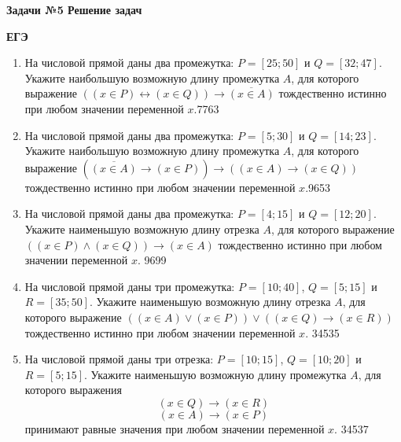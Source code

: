 \usepackage{stmaryrd}%




    \begin{center}
        \textbf{Задачи №5 Решение задач}\\
    \end{center}

    \begin{center}
        \textbf{ЕГЭ}\\
    \end{center}

    \begin{spacing}{1.1}
        \begin{enumerate}
            \item На числовой прямой даны два промежутка: $P = [25; 50]$ и $Q = [32; 47]$.
            Укажите наибольшую возможную длину промежутка $A$, для которого выражение
            $((x \in P) \leftrightarrow (x \in Q)) \rightarrow \overline{(x \in A)}$
            тождественно истинно при любом значении переменной $x$.7763

            \item На числовой прямой даны два промежутка: $P = [5; 30]$ и $Q = [14; 23]$.
            Укажите наибольшую возможную длину промежутка $A$, для которого выражение
            $(\overline{(x \in A)} \rightarrow (x \in P)) \rightarrow ((x \in A) \rightarrow (x \in Q))$
            тождественно истинно при любом значении переменной $x$.9653

            \item На числовой прямой даны два промежутка: $P = [4; 15]$ и $Q = [12; 20]$.
            Укажите наименьшую возможную длину отрезка $A$, для которого выражение
            $((x \in P) \wedge (x \in Q)) \rightarrow (x \in A)$
            тождественно истинно при любом значении переменной $x$. 9699

            \item На числовой прямой даны три промежутка: $P = [10; 40]$, $Q = [5; 15]$ и $R = [35; 50]$.
            Укажите наименьшую возможную длину отрезка $A$, для которого выражение
            $((x \in A) \vee (x \in P)) \vee ((x \in Q) \rightarrow (x \in R))$
            тождественно истинно при любом значении переменной $x$. 34535

            \item На числовой прямой даны три отрезка: $P = [10; 15]$, $Q = [10; 20]$ и $R = [5; 15]$.
            Укажите наименьшую возможную длину промежутка $A$, для которого выражения
            \[(x \in Q) \rightarrow (x \in R)\]
            \[(x \in A) \rightarrow (x \in P)\]
            принимают равные значения при любом значении переменной $x$. 34537


\end{enumerate}
\end{spacing}
